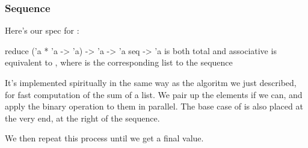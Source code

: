 \documentclass[aspectratio=169]{beamer}
\begin{document}
\begin{frame}[fragile]
  \frametitle{Sequence }

  Here's our spec for :

  \pause
  \spec
    {reduce}
    {('a * 'a -> 'a) -> 'a -> 'a seq -> 'a}
    { is both total and associative}
    { is equivalent to , where 
    is the corresponding list to the sequence }

  \pause
  It's implemented spiritually in the same way as the algoritm we just described,
  for fast computation of the sum of a list. We pair up the elements if we can,
  and apply the binary operation to them in parallel. The base case of 
  is also placed at the very end, at the right of the sequence.

  \pause
  \vspace{\fill}

  We then repeat this process until we get a final value.
\end{frame}
\end{document}
